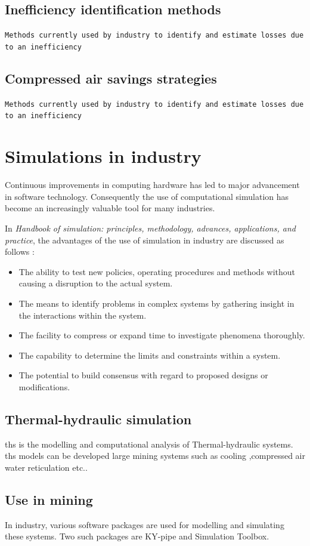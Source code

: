 	\subsection{Inefficiency identification methods}
	\texttt{Methods currently used by industry to identify and estimate losses due to an inefficiency}	
	\subsection{Compressed air savings strategies}
	\texttt{Methods currently used by industry to identify and estimate losses due to an inefficiency}
\section{Simulations in industry}
Continuous improvements in computing hardware has led to major advancement in software technology. Consequently the use of computational simulation has become an increasingly valuable tool for many industries.\cite{kocsis2003integration} \par 
 In \textit{ Handbook of simulation: principles, methodology, advances, applications, and practice}, the advantages of the use of simulation in industry are discussed as follows \cite{banks1998handbook}: 
\begin{itemize}
	\item The ability to test new policies, operating procedures and methods without causing a disruption to the actual system.
	\item The means to identify problems in complex systems by gathering insight in the interactions within the system.
	\item The facility to compress or expand time to investigate phenomena thoroughly.
	\item The capability to determine the limits and constraints within a system.
	\item The potential to build consensus with regard to proposed designs or modifications.
\end{itemize}
\subsection{Thermal-hydraulic simulation}
\gls{ths} is the modelling and computational analysis of Thermal-hydraulic systems. \gls{ths} models can be developed large mining systems such as cooling ,compressed air water reticulation etc..\par

\subsection{Use in mining}
In industry, various software packages are used for modelling and simulating these systems. Two such packages are KY-pipe and Simulation Toolbox.

